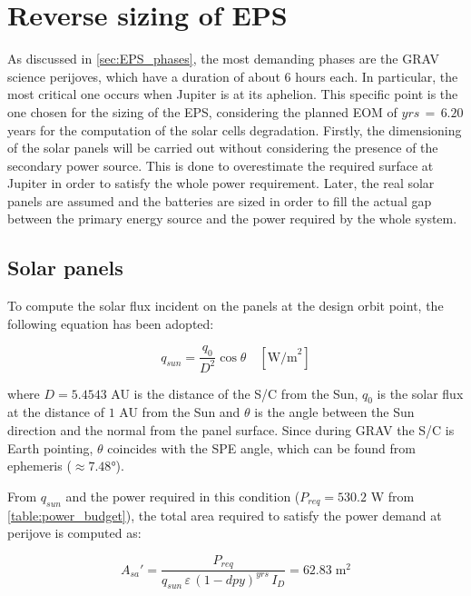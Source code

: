 \section{Reverse sizing of EPS}
\label{sec:EPS_sizing}

As discussed in \autoref{sec:EPS_phases}, the most demanding phases are the GRAV science perijoves, which have a duration of about 6 hours each. In particular, the most critical one occurs when Jupiter is at its aphelion.
This specific point is the one chosen for the sizing of the EPS, considering the planned EOM of $yrs \, = \, 6.20$ years for the computation of the solar cells degradation.
Firstly, the dimensioning of the solar panels will be carried out without considering the presence of the secondary power source.
This is done to overestimate the required surface at Jupiter in order to satisfy the whole power requirement.
Later, the real solar panels are assumed and the batteries are sized in order to fill the actual gap between the primary energy source and the power required by the whole system. 


\subsection{Solar panels}
\label{subsec:solar_panels_sizing}

To compute the solar flux incident on the panels at the design orbit point, the following equation has been adopted:

\begin{equation}
    q_{sun} = \frac{q_0}{D^2} \cos \theta \quad [ \textrm{W/m}^2 ]
\end{equation}

where $D = 5.4543$ AU is the distance of the S/C from the Sun, $q_0$ is the solar flux at the distance of $1$ AU from the Sun and $\theta$ is the angle between the Sun direction and the normal from the panel surface.
Since during GRAV the S/C is Earth pointing, $\theta$ coincides with the SPE angle, which can be found from ephemeris ($\approx 7.48$°).

From $q_{sun}$ and the power required in this condition ($P_{req} = 530.2$ W from \autoref{table:power_budget}), the total area required to satisfy the power demand at perijove is computed as:

\begin{equation}
    A_{sa}' = \frac{P_{req}}{q_{sun} \, \varepsilon \, \left( 1 - dpy \right) ^ {yrs} \, I_D} = 62.83 \; \textrm{m}^2
    \label{eq:A_sa}
\end{equation}


